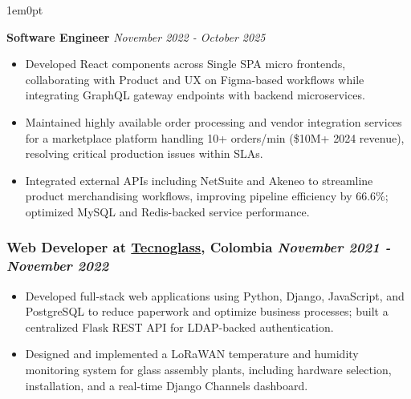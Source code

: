 \documentclass[a4paper,10pt]{article}
\begin{document}
\begin{adjustwidth}{1em}{0pt}
\begin{itemize}
\end{itemize}

\smallskip
\noindent\textbf{Software Engineer}
\hfill\textit{November 2022 - October 2025}
\begin{itemize}
  \item Developed React components across Single SPA micro frontends, collaborating with Product and UX on Figma-based workflows while integrating GraphQL gateway endpoints with backend microservices.
  \item Maintained highly available order processing and vendor integration services for a marketplace platform handling 10+ orders/min (\$10M+ 2024 revenue), resolving critical production issues within SLAs.
  \item Integrated external APIs including NetSuite and Akeneo to streamline product merchandising workflows, improving pipeline efficiency by 66.6\%; optimized MySQL and Redis-backed service performance.
\end{itemize}
\end{adjustwidth}

\subsubsection*{%
  \textbf{Web Developer} at \href{https://www.tecnoglass.com/en/}{\textbf{Tecnoglass}}, Colombia
  \hfill
  \textit{November 2021 - November 2022}
}
\begin{itemize}
  \item Developed full-stack web applications using Python, Django, JavaScript, and PostgreSQL to reduce paperwork and optimize business processes; built a centralized Flask REST API for LDAP-backed authentication.
  \item Designed and implemented a LoRaWAN temperature and humidity monitoring system for glass assembly plants, including hardware selection, installation, and a real-time Django Channels dashboard.
\end{itemize}
\end{document}
